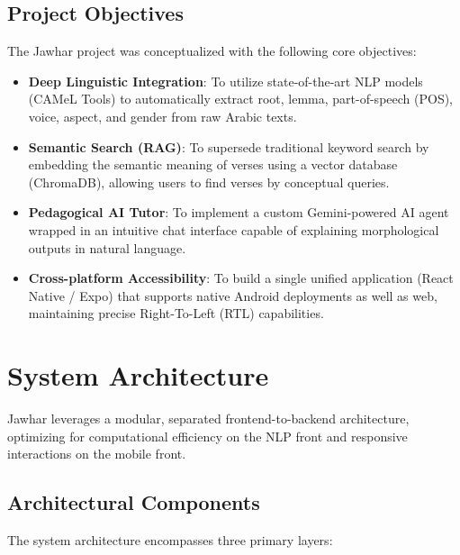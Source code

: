 \documentclass[11pt, a4paper]{article}
\begin{document}
\subsection{Project Objectives}
The Jawhar project was conceptualized with the following core objectives:
\begin{itemize}
    \item \textbf{Deep Linguistic Integration}: To utilize state-of-the-art NLP models (CAMeL Tools) to automatically extract root, lemma, part-of-speech (POS), voice, aspect, and gender from raw Arabic texts.
    \item \textbf{Semantic Search (RAG)}: To supersede traditional keyword search by embedding the semantic meaning of verses using a vector database (ChromaDB), allowing users to find verses by conceptual queries.
    \item \textbf{Pedagogical AI Tutor}: To implement a custom Gemini-powered AI agent wrapped in an intuitive chat interface capable of explaining morphological outputs in natural language.
    \item \textbf{Cross-platform Accessibility}: To build a single unified application (React Native / Expo) that supports native Android deployments as well as web, maintaining precise Right-To-Left (RTL) capabilities.
\end{itemize}

\section{System Architecture}

Jawhar leverages a modular, separated frontend-to-backend architecture, optimizing for computational efficiency on the NLP front and responsive interactions on the mobile front.

\subsection{Architectural Components}
The system architecture encompasses three primary layers:
\end{document}
